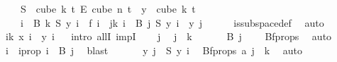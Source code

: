 \begin{isabellebody}
\ \ \ \ S\ {\isasymin}\ {\isacharparenleft}{\kern0pt}cube\ k\ t{\isacharparenright}{\kern0pt}\ {\isasymrightarrow}\isactrlsub E\ {\isacharparenleft}{\kern0pt}cube\ n\ t{\isacharparenright}{\kern0pt}\ {\isasymand}\ {\isacharparenleft}{\kern0pt}{\isasymforall}y\ {\isasymin}\ cube\ k\ t{\isachardot}{\kern0pt}\isanewline
\ \ \ \ {\isacharparenleft}{\kern0pt}{\isasymforall}i\ {\isasymin}\ B\ k{\isachardot}{\kern0pt}\ S\ y\ i\ {\isacharequal}{\kern0pt}\ f\ i{\isacharparenright}{\kern0pt}\ {\isasymand}\ {\isacharparenleft}{\kern0pt}{\isasymforall}j{\isacharless}{\kern0pt}k{\isachardot}{\kern0pt}\ {\isasymforall}i\ {\isasymin}\ B\ j{\isachardot}{\kern0pt}\ {\isacharparenleft}{\kern0pt}S\ y{\isacharparenright}{\kern0pt}\ i\ {\isacharequal}{\kern0pt}\ y\ j{\isacharparenright}{\kern0pt}{\isacharparenright}{\kern0pt}{\isachardoublequoteclose}\isanewline
\ \ \ \ \isamarkupfalse%
\ is{\isacharunderscore}{\kern0pt}subspace{\isacharunderscore}{\kern0pt}def\ \isamarkupfalse%
\ auto\isanewline
\ \isamarkupfalse%
\ {\isachardoublequoteopen}{\isasymforall}i{\isacharless}{\kern0pt}k{\isachardot}{\kern0pt}\ x\ i\ {\isacharequal}{\kern0pt}\ y\ i{\isachardoublequoteclose}\isanewline
\ \isamarkupfalse%
\ {\isacharparenleft}{\kern0pt}intro\ allI\ impI{\isacharparenright}{\kern0pt}\isanewline
\ \ \isamarkupfalse%
\ j\ \isamarkupfalse%
\ {\isachardoublequoteopen}j\ {\isacharless}{\kern0pt}\ k{\isachardoublequoteclose}\isanewline
\ \ \ \isamarkupfalse%
\ \isamarkupfalse%
\ {\isachardoublequoteopen}B\ j\ {\isasymnoteq}\ {\isacharbraceleft}{\kern0pt}{\isacharbraceright}{\kern0pt}{\isachardoublequoteclose}\ \isamarkupfalse%
\ Bf{\isacharunderscore}{\kern0pt}props\ \isamarkupfalse%
\ auto\isanewline
\ \ \ \isamarkupfalse%
\ \isamarkupfalse%
\ i\ \ i{\isacharunderscore}{\kern0pt}prop{\isacharcolon}{\kern0pt}\ {\isachardoublequoteopen}i\ {\isasymin}\ B\ j{\isachardoublequoteclose}\ \isamarkupfalse%
\ blast\isanewline
\ \ \ \isamarkupfalse%
\ \isamarkupfalse%
\ {\isachardoublequoteopen}y\ j\ {\isacharequal}{\kern0pt}\ S\ y\ i{\isachardoublequoteclose}\ \isamarkupfalse%
\ Bf{\isacharunderscore}{\kern0pt}props\ a{\isacharparenleft}{\kern0pt}{}{\isacharparenright}{\kern0pt}\ {\isacartoucheopen}j\ {\isacharless}{\kern0pt}\ k{\isacartoucheclose}\ \isamarkupfalse%
\ auto\isanewline

\end{isabellebody}
